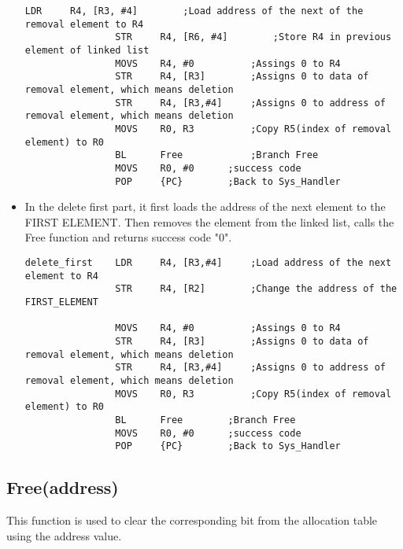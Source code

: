 \documentclass[pdftex,12pt,a4paper]{article}
\begin{document}
\begin{itemize}
\begin{lstlisting}[caption=Delete, style=customasm]
				LDR		R4, [R3, #4]		;Load address of the next of the removal element to R4
				STR 	R4, [R6, #4]		;Store R4 in previous element of linked list 
				MOVS	R4, #0			;Assings 0 to R4
				STR		R4, [R3]		;Assigns 0 to data of removal element, which means deletion
				STR 	R4, [R3,#4]		;Assigns 0 to address of removal element, which means deletion
				MOVS	R0, R3			;Copy R5(index of removal element) to R0
				BL		Free			;Branch Free
				MOVS	R0, #0		;success code
				POP		{PC}		;Back to Sys_Handler
    \end{lstlisting}
    
    \item In the delete first part, it first loads the address of the next element to the FIRST ELEMENT. Then removes the element from the linked list, calls the Free function and returns success code "0".
    \begin{lstlisting}[caption=Delete\_first, style=customasm]
delete_first	LDR		R4, [R3,#4]		;Load address of the next element to R4
				STR		R4, [R2]		;Change the address of the FIRST_ELEMENT
				
				MOVS	R4, #0			;Assings 0 to R4
				STR		R4, [R3]		;Assigns 0 to data of removal element, which means deletion
				STR 	R4, [R3,#4]		;Assigns 0 to address of removal element, which means deletion
				MOVS	R0, R3			;Copy R5(index of removal element) to R0
				BL		Free		;Branch Free
				MOVS	R0, #0		;success code
				POP		{PC}		;Back to Sys_Handler
    \end{lstlisting}
\end{itemize}
\newpage
\subsection{Free(address)}
\par This function is used to clear the corresponding bit from the allocation table using the address value.
\end{document}
